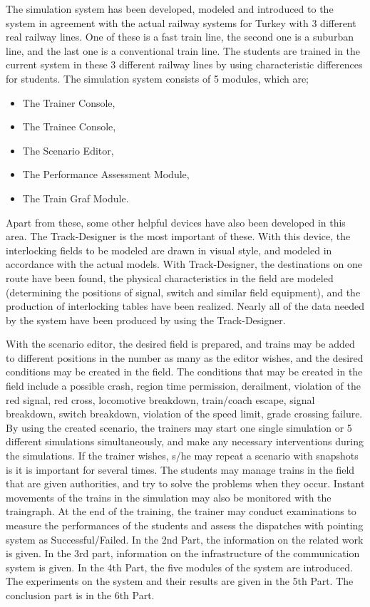 \documentclass[conference]{IEEEtran}
\begin{document}
The simulation system has been developed, modeled and introduced to the system in agreement with the actual railway systems for Turkey with 3 different real railway lines. One of these is a fast train line, the second one is a suburban line, and the last one is a conventional train line. The students are trained in the current system in these 3 different railway lines by using characteristic differences for students. 
The simulation system consists of 5 modules, which are;
\begin{itemize}
\item The Trainer Console,
\item The Trainee Console,
\item The Scenario Editor,
\item The Performance Assessment Module,
\item The Train Graf Module. 
\end{itemize}

Apart from these, some other helpful devices have also been developed in this area. The Track-Designer is the most important of these. With this device, the interlocking fields to be modeled are drawn in visual style, and modeled in accordance with the actual models. With Track-Designer, the destinations on one route have been found, the physical characteristics in the field are modeled (determining the positions of signal, switch and similar field equipment), and the production of interlocking tables have been realized. Nearly all of the data needed by the system have been produced by using the Track-Designer. 
 
With the scenario editor, the desired field is prepared, and trains may be added to different positions in the number as many as the editor wishes, and the desired conditions may be created in the field. The conditions that may be created in the field include a possible crash, region time permission, derailment, violation of the red signal, red cross, locomotive breakdown, train/coach escape, signal breakdown, switch breakdown, violation of the speed limit, grade crossing failure. By using the created scenario, the trainers may start one single simulation or 5 different simulations simultaneously, and make any necessary interventions during the simulations. If the trainer wishes, s/he may repeat a scenario with snapshots is it is important for several times. The students may manage trains in the field that are given authorities, and try to solve the problems when they occur. Instant movements of the trains in the simulation may also be monitored with the traingraph. At the end of the training, the trainer may conduct examinations to measure the performances of the students and assess the dispatches with pointing system as Successful/Failed. 
In the 2nd Part, the information on the related work is given. In the 3rd part, information on the infrastructure of the communication system is given. In the 4th Part, the five modules of the system are introduced. The experiments on the system and their results are given in the 5th Part. The conclusion part is in the 6th Part.
\end{document}
